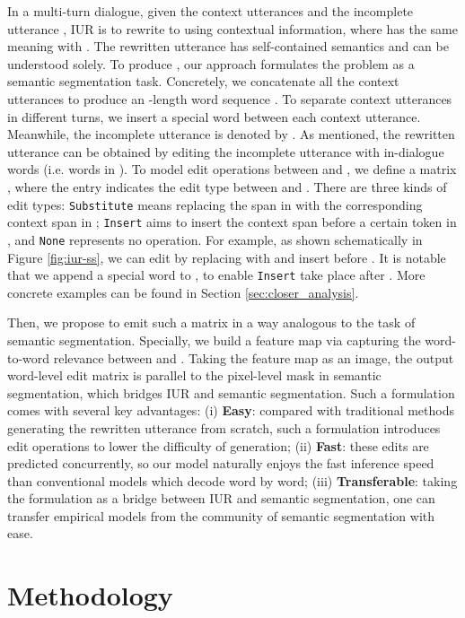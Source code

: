 \documentclass[11pt,a4paper]{article}
\begin{document}
In a multi-turn dialogue, given the context utterances  and the incomplete utterance , IUR is to rewrite  to  using contextual information, where  has the same meaning with . The rewritten utterance  has self-contained semantics and can be understood solely. To produce , our approach formulates the problem as a semantic segmentation task. Concretely, we concatenate all the context utterances to produce an -length word sequence . To separate context utterances in different turns, we insert a special word  between each context utterance. Meanwhile, the incomplete utterance is denoted by . As mentioned, the rewritten utterance  can be obtained by editing the incomplete utterance  with in-dialogue words (i.e. words in ). To model edit operations between  and , we define a  matrix , where the entry  indicates the edit type between  and . There are three kinds of edit types: {\small\texttt{Substitute}} means replacing the span in  with the corresponding context span in ; {\small\texttt{Insert}} aims to insert the context span before a certain token in , and {\small\texttt{None}} represents no operation. For example, as shown schematically in Figure \ref{fig:iur-ss}, we can edit  by replacing  with  and insert  before . It is notable that we append a special word  to , to enable {\small\texttt{Insert}} take place after . More concrete examples can be found in Section \ref{sec:closer_analysis}.


Then, we propose to emit such a matrix  in a way analogous to the task of semantic segmentation. Specially, we build a  feature map via capturing the word-to-word relevance between  and . Taking the feature map as an image, the output word-level edit matrix  is parallel to the pixel-level mask in semantic segmentation, which bridges IUR and semantic segmentation. Such a formulation comes with several key advantages:
(i) \textbf{Easy}: compared with traditional methods generating the rewritten utterance from scratch, such a formulation introduces edit operations to lower the difficulty of generation;
(ii) \textbf{Fast}: these edits are predicted concurrently, so our model naturally enjoys the fast inference speed than conventional models which decode word by word;
(iii) \textbf{Transferable}: taking the formulation as a bridge between IUR and semantic segmentation, one can transfer empirical models from the community of semantic segmentation with ease.

\section{Methodology}\label{sec:method_model}
\end{document}
